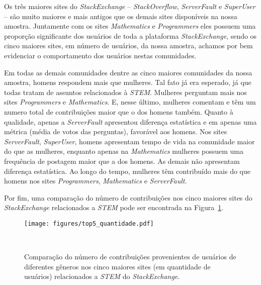 Os três maiores sites do \emph{StackExchange} -- \emph{StackOverflow}, \emph{ServerFault} e \emph{SuperUser} -- são muito maiores e mais antigos que os demais sites disponíveis na nossa amostra. Juntamente com os sites \emph{Mathematics} e \emph{Programmers} eles possuem uma proporção significante dos usuários de toda a plataforma \emph{StackExchange}, sendo os cinco maiores sites, em número de usuários, da nossa amostra, achamos por bem evidenciar o comportamento dos usuários nestas comunidades. 

Em todas as demais comunidades dentre as cinco maiores comunidades da nossa amostra, homens respondem mais que mulheres. Tal fato já era esperado, já que todas tratam de assuntos relacionados à \emph{STEM}. Mulheres perguntam mais nos sites \emph{Programmers} e \emph{Mathematics}. E, nesse último, mulheres comentam e têm um numero total de contribuições maior que o dos homens também. Quanto à qualidade, apenas a \emph{ServerFault} apresentou diferença estatística e em apenas uma métrica (média de votos das perguntas), favorável aos homens. Nos sites \emph{ServerFault}, \emph{SuperUser}, homens apresentam tempo de vida na comunidade maior do que as mulheres, enquanto apenas na \emph{Mathematics} mulheres possuem uma frequência de postagem maior que a dos homens. As demais não apresentam diferença estatística. Ao longo do tempo, mulheres têm contribuído mais do que homens nos sites \emph{Programmers}, \emph{Mathematics} e \emph{ServerFault}. 

Por fim, uma comparação do número de contribuições nos cinco maiores sites do \emph{StackExchange} relacionados a \emph{STEM} pode ser encontrada na Figura~\ref{fig:top-five}.


\begin{figure}[!b]
  \centering
  \texttt{[image: figures/top5\_quantidade.pdf]}
  \caption[Comparação do número de contribuições na 5 maiores comunidades.]{Comparação do número de contribuições provenientes de usuários de diferentes gêneros nos cinco maiores sites (em quantidade de usuários) relacionados a \emph{STEM} do \emph{StackExchange}.}~\label{fig:top-five}
\end{figure}






